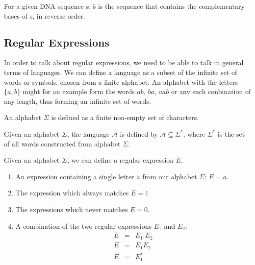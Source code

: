 \documentclass[12pt]{article}
\theoremstyle{definition}
\begin{document}
\begin{definition}
For a given DNA sequence s, \~{s} is the sequence that contains the complementary bases of s, in reverse order.
\end{definition}

\subsection{Regular Expressions}

In order to talk about regular expressions, we need to be able to talk in general terms of languages. We can define a language as a subset of the infinite set of words or symbols, chosen from a finite alphabet. An alphabet with the letters $\{a,b\}$ might for an example form the words $ab$, $ba$, $aab$ or any such conbination of any length, thus forming an infinite set of words.\\

\begin{definition} An alphabet $\Sigma$ is defined as a finite non-empty set of characters.

\end{definition}

\begin{definition} Given an alphabet $\Sigma$, the language $\mathcal{A}$ is defined by $\mathcal{A} \subseteq \Sigma^*$, where $\Sigma^*$ is the set of all words constructed from alphabet $\Sigma$.
	
\end{definition} 

\begin{definition} Given an alphabet $\Sigma$, we can define a regular expression $E$.\\

	\begin{enumerate}
		\item An expression containing a single letter $a$ from our alphabet $\Sigma$: $E = a$. 
		\item The expression which always matches $E = 1$
		\item The expressions which never matches $E = 0$.
		\item A combination of the two regular expressions $E_1$ and $E_2$:
		\begin{eqnarray}
			E &=& E_1 | E_2 \\
			E &=& E_1E_2 \\
			E &=& E_1^*
		\end{eqnarray}
	\end{enumerate}	
\end{definition} 
\end{document}

